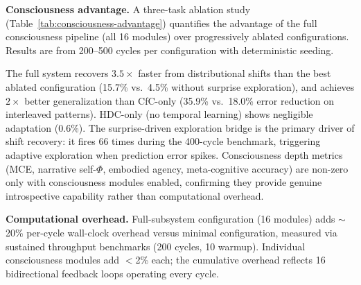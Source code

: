 \documentclass[10pt,letterpaper]{article}
\renewcommand{\Phi}{\varPhi}
\begin{document}
\textbf{Consciousness advantage.} A three-task ablation study (Table~\ref{tab:consciousness-advantage}) quantifies the advantage of the full consciousness pipeline (all 16 modules) over progressively ablated configurations. Results are from 200--500 cycles per configuration with deterministic seeding.

\begin{table}[ht]
\centering
\caption{Consciousness advantage across three tasks. Recovery\%: fraction of post-shift error spike recovered. Reduce\%: prediction error reduction on interleaved multi-pattern input. Subsystems: count of active consciousness modules (of 7 measured).}
\label{tab:consciousness-advantage}
\small
{}
\end{table}

The full system recovers $3.5\times$ faster from distributional shifts than the best ablated configuration (15.7\% vs.\ 4.5\% without surprise exploration), and achieves $2\times$ better generalization than CfC-only (35.9\% vs.\ 18.0\% error reduction on interleaved patterns). HDC-only (no temporal learning) shows negligible adaptation (0.6\%). The surprise-driven exploration bridge is the primary driver of shift recovery: it fires 66 times during the 400-cycle benchmark, triggering adaptive exploration when prediction error spikes. Consciousness depth metrics (MCE, narrative self-$\Phi$, embodied agency, meta-cognitive accuracy) are non-zero only with consciousness modules enabled, confirming they provide genuine introspective capability rather than computational overhead.

\textbf{Computational overhead.} Full-subsystem configuration (16 modules) adds $\sim$20\% per-cycle wall-clock overhead versus minimal configuration, measured via sustained throughput benchmarks (200 cycles, 10 warmup). Individual consciousness modules add $<$2\% each; the cumulative overhead reflects 16 bidirectional feedback loops operating every cycle.
\end{document}
